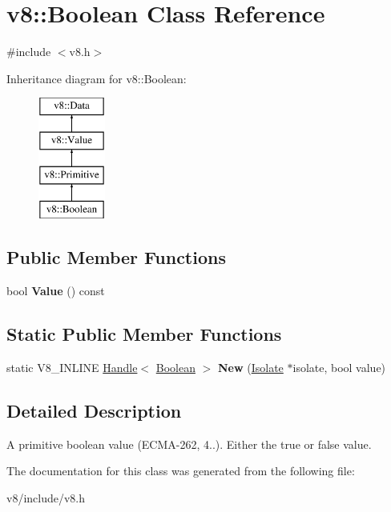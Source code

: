 \hypertarget{classv8_1_1Boolean}{\section{v8\-:\-:Boolean Class Reference}
\label{classv8_1_1Boolean}
}


{\ttfamily \#include $<$v8.\-h$>$}

Inheritance diagram for v8\-:\-:Boolean\-:\begin{figure}[H]
\begin{center}
\leavevmode
\includegraphics[height=4.000000cm]{classv8_1_1Boolean}
\end{center}
\end{figure}
\subsection*{Public Member Functions}
\begin{DoxyCompactItemize}
\item 
\hypertarget{classv8_1_1Boolean_aa493d54eb43afc64ab796e1cf66ff910}{bool {\bfseries Value} () const }\label{classv8_1_1Boolean_aa493d54eb43afc64ab796e1cf66ff910}

\end{DoxyCompactItemize}
\subsection*{Static Public Member Functions}
\begin{DoxyCompactItemize}
\item 
\hypertarget{classv8_1_1Boolean_a936637bda9841b5150d5bce6181ef808}{static V8\-\_\-\-I\-N\-L\-I\-N\-E \hyperlink{classv8_1_1Handle}{Handle}$<$ \hyperlink{classv8_1_1Boolean}{Boolean} $>$ {\bfseries New} (\hyperlink{classv8_1_1Isolate}{Isolate} $\ast$isolate, bool value)}\label{classv8_1_1Boolean_a936637bda9841b5150d5bce6181ef808}

\end{DoxyCompactItemize}


\subsection{Detailed Description}
A primitive boolean value (E\-C\-M\-A-\/262, 4..). Either the true or false value. 

The documentation for this class was generated from the following file\-:\begin{DoxyCompactItemize}
\item 
v8/include/v8.\-h\end{DoxyCompactItemize}
